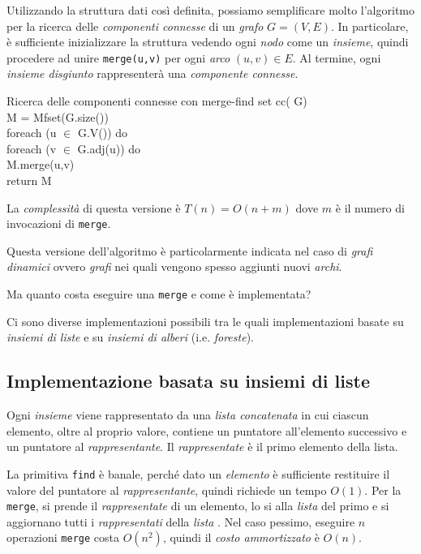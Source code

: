 \noindent
Utilizzando la struttura dati così definita, possiamo semplificare molto
l'algoritmo per la ricerca delle \emph{componenti connesse} di un \emph{grafo}
$G=(V,E)$. In particolare, è sufficiente inizializzare la struttura vedendo ogni
\emph{nodo} come un \emph{insieme}, quindi procedere ad unire \texttt{merge(u,v)}
per ogni \emph{arco} $(u,v)\in E$. Al termine, ogni \emph{insieme disgiunto}
rappresenterà una \emph{componente connesse}.

\begin{minicode}{Ricerca delle componenti connesse con merge-find set}
    \ind{} cc( G)\\
         M = Mfset(G.size())\\
        \indf foreach (u $\in$ G.V()) do\\
            \indff foreach (v $\in$ G.adj(u)) do\\
                M.merge(u,v)\\
        \indf return M
\end{minicode}\noindent
La \emph{complessità} di questa versione è $T(n)=O(n+m)$ dove $m$ è il numero di
invocazioni di \texttt{merge}.

\begin{note}
    Questa versione dell'algoritmo è particolarmente indicata nel caso di
    \emph{grafi dinamici} ovvero \emph{grafi} nei quali vengono spesso aggiunti
    nuovi \emph{archi}.
\end{note}

\bigskip\noindent
Ma quanto costa eseguire una \texttt{merge} e come è implementata?

Ci sono diverse implementazioni possibili tra le quali implementazioni basate su
\emph{insiemi di liste} e su \emph{insiemi di alberi} (i.e. \emph{foreste}).

\subsection{Implementazione basata su insiemi di liste}
Ogni \emph{insieme} viene rappresentato da una \emph{lista concatenata} in cui
ciascun elemento, oltre al proprio valore, contiene un puntatore all'elemento
successivo e un puntatore al \emph{rappresentante}. Il \emph{rappresentate} è
il primo elemento della lista.

La primitiva \texttt{find} è banale, perché dato un \emph{elemento} è sufficiente
restituire il valore del puntatore al \emph{rappresentante}, quindi richiede un
tempo $O(1)$. Per la \texttt{merge}, si prende il \emph{rappresentate} di un
elemento, lo si  alla \emph{lista} del primo e si aggiornano tutti i
\emph{rappresentati} della \emph{lista} . Nel caso pessimo, eseguire
$n$ operazioni \texttt{merge} costa $O(n^2)$, quindi il \emph{costo ammortizzato}
è $O(n)$.

